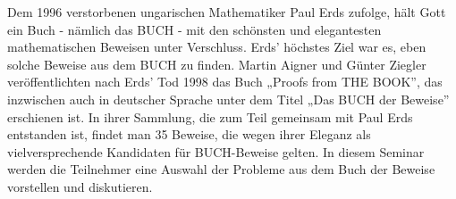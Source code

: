 \begin{module}
\begin{learningoutcomes}
\end{learningoutcomes}

\begin{content}
Dem 1996 verstorbenen ungarischen Mathematiker Paul Erds zufolge, hält Gott ein Buch - nämlich das BUCH - mit den schönsten und elegantesten mathematischen Beweisen unter Verschluss. Erds' höchstes Ziel war es, eben solche Beweise aus dem BUCH zu finden. \newline
\newline
 Martin Aigner und Günter Ziegler veröffentlichten nach Erds' Tod 1998 das Buch „Proofs from THE BOOK”, das inzwischen auch in deutscher Sprache unter dem Titel „Das BUCH der Beweise” erschienen ist. In ihrer Sammlung, die zum Teil gemeinsam mit Paul Erds entstanden ist, findet man 35 Beweise, die wegen ihrer Eleganz als vielversprechende Kandidaten für BUCH-Beweise gelten. \newline
\newline
 In diesem Seminar werden die Teilnehmer eine Auswahl der Probleme aus dem Buch der Beweise vorstellen und diskutieren.


\end{content}



\end{module}

